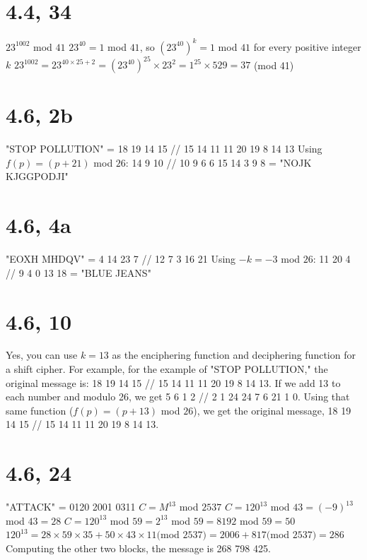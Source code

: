\documentclass{article}
\begin{document}
\section{4.4, 34}
$23^{1002}$ mod $41$
\newline
$23^{40} = 1$ mod $41$, so $(23^{40})^k = 1$ mod $41$ for every positive integer $k$
\newline
$23^{1002} = 23^{40 \times 25 + 2} = (23^{40})^{25} \times 23^2 = 1^{25} \times 529 = 37$ (mod 41)

\section{4.6, 2b}
"STOP POLLUTION" = 18 19 14 15 // 15 14 11 11 20 19 8 14 13
\newline
Using $f(p) = (p + 21)$ mod $26$:
 14 9 10 // 10 9 6 6 15 14 3 9 8 = "NOJK KJGGPODJI"

\section{4.6, 4a}
"EOXH MHDQV" = 4 14 23 7 // 12 7 3 16 21
\newline
Using $-k = -3$ mod $26$:
 11 20 4 // 9 4 0 13 18 = "BLUE JEANS"

\section{4.6, 10}
Yes, you can use $k = 13$ as the enciphering function and deciphering function for a shift cipher. For example, for the example of "STOP POLLUTION," the original message is: 18 19 14 15 // 15 14 11 11 20 19 8 14 13. If we add 13 to each number and modulo 26, we get 5 6 1 2 // 2 1 24 24 7 6 21 1 0. Using that same function ($f(p) = (p + 13)$ mod $26$), we get the original message, 18 19 14 15 // 15 14 11 11 20 19 8 14 13.

\section{4.6, 24}
"ATTACK" = 0120 2001 0311
\newline
$C = M^{13}$ mod $2537$
\newline
$C = 120^{13}$ mod $43 = (-9)^{13}$ mod $43 = 28$
\newline
$C = 120^{13}$ mod $59 = 2^{13}$ mod $59 = 8192$ mod $59 = 50$
\newline
$120^{13} = 28 \times 59 \times 35 + 50 \times 43 \times 11 ($mod $2537) = 2006 + 817 ($mod $2537) = 286$
\newline
Computing the other two blocks, the message is 268 798 425.
\end{document}
